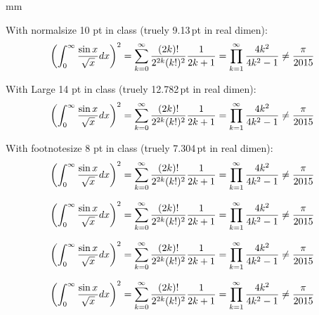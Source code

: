 
 mm
\begin{minipage}[htpb]{80mm}
		\vspace*{45mm}
			{\normalsize With normalsize 10 pt in class (truely 9.13\,pt in real dimen):
				\[ \sampleEq \]\par}

			{\Large With Large 14 pt in class (truely 12.782\,pt in real dimen):
				\[ \sampleEq \]\par}

			{\footnotesize With footnotesize 8 pt in class (truely 7.304\,pt in real dimen):
				\[ \sampleEq \]\par}
\end{minipage}

\clearpage
\begin{minipage}[htpb]{120mm}
		\vspace*{10mm}
			{\normalsize 
				\[ \sampleEq \]\par}

			{\Large 
				\[ \sampleEq \]\par}

			{\footnotesize
				\[ \sampleEq \]\par}
\end{minipage}